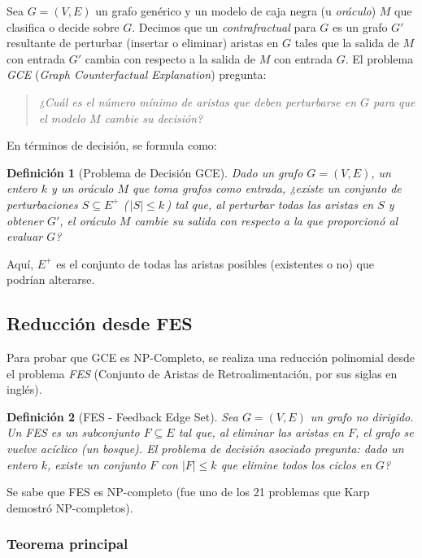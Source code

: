 \documentclass[a4paper]{article}
\newtheorem{definition}{Definición}
\begin{document}
Sea $G = (V, E)$ un grafo genérico y un modelo de caja negra (u \emph{oráculo}) $M$ que clasifica o decide sobre $G$. 
Decimos que un \emph{contrafractual} para $G$ es un grafo $G'$ resultante de perturbar (insertar o eliminar) aristas en $G$ tales que la salida de $M$ con entrada $G'$ cambia con respecto a la salida de $M$ con entrada $G$.  
El problema \emph{GCE} (\emph{Graph Counterfactual Explanation}) pregunta: 

\begin{quote}
    \emph{¿Cuál es el número mínimo de aristas que deben perturbarse en $G$ para que el modelo $M$ cambie su decisión?}
\end{quote}

En términos de decisión, se formula como:

\begin{definition}[Problema de Decisión GCE]
Dado un grafo $G=(V,E)$, un entero $k$ y un oráculo $M$ que toma grafos como entrada,  
¿existe un conjunto de perturbaciones $S \subseteq E^+$
(\,$|S| \leq k$\,) 
tal que, al perturbar todas las aristas en $S$ y obtener $G'$, 
el oráculo $M$ cambie su salida con respecto a la que proporcionó al evaluar $G$?
\end{definition}

Aquí, $E^+$ es el conjunto de todas las aristas posibles (existentes o no) que podrían alterarse.

\subsection{Reducción desde FES}

Para probar que GCE es NP-Completo, se realiza una reducción polinomial desde el problema \emph{FES} (Conjunto de Aristas de Retroalimentación, por sus siglas en inglés). 

\begin{definition}[FES - Feedback Edge Set]
Sea $G=(V,E)$ un grafo no dirigido. 
Un \emph{FES} es un subconjunto $F \subseteq E$ tal que, al eliminar las aristas en $F$, el grafo se vuelve acíclico (un bosque).  
El problema de decisión asociado pregunta: \emph{dado un entero $k$, existe un conjunto $F$ con $|F|\leq k$ que elimine todos los ciclos en $G$?}
\end{definition}

Se sabe que FES es NP-completo (fue uno de los 21 problemas que Karp demostró NP-completos).

\subsubsection*{Teorema principal}
\end{document}
